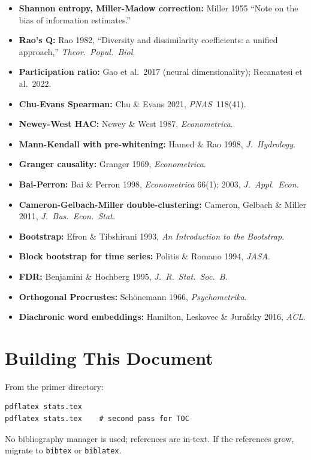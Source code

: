 \documentclass[11pt]{article}
\begin{document}
\begin{itemize}[nosep]
  \item \textbf{Shannon entropy, Miller-Madow correction:} Miller 1955
    ``Note on the bias of information estimates.''
  \item \textbf{Rao's Q:} Rao 1982, ``Diversity and dissimilarity
    coefficients: a unified approach,'' \textit{Theor.\ Popul.\ Biol.}
  \item \textbf{Participation ratio:} Gao et al.\ 2017 (neural
    dimensionality); Recanatesi et al.\ 2022.
  \item \textbf{Chu-Evans Spearman:} Chu \& Evans 2021,
    \textit{PNAS}~118(41).
  \item \textbf{Newey-West HAC:} Newey \& West 1987,
    \textit{Econometrica}.
  \item \textbf{Mann-Kendall with pre-whitening:} Hamed \& Rao 1998,
    \textit{J.~Hydrology}.
  \item \textbf{Granger causality:} Granger 1969,
    \textit{Econometrica}.
  \item \textbf{Bai-Perron:} Bai \& Perron 1998, \textit{Econometrica}
    66(1); 2003, \textit{J.~Appl.\ Econ.}
  \item \textbf{Cameron-Gelbach-Miller double-clustering:}
    Cameron, Gelbach \& Miller 2011, \textit{J.~Bus.\ Econ.\ Stat.}
  \item \textbf{Bootstrap:} Efron \& Tibshirani 1993,
    \textit{An Introduction to the Bootstrap}.
  \item \textbf{Block bootstrap for time series:} Politis \& Romano 1994,
    \textit{JASA}.
  \item \textbf{FDR:} Benjamini \& Hochberg 1995, \textit{J.\ R.~Stat.\
    Soc.\ B}.
  \item \textbf{Orthogonal Procrustes:} Schönemann 1966,
    \textit{Psychometrika}.
  \item \textbf{Diachronic word embeddings:} Hamilton, Leskovec \&
    Jurafsky 2016, \textit{ACL}.
\end{itemize}

\section*{Building This Document}

From the primer directory:
\begin{verbatim}
pdflatex stats.tex
pdflatex stats.tex    # second pass for TOC
\end{verbatim}

No bibliography manager is used; references are in-text. If the
references grow, migrate to \texttt{bibtex} or \texttt{biblatex}.
\end{document}
